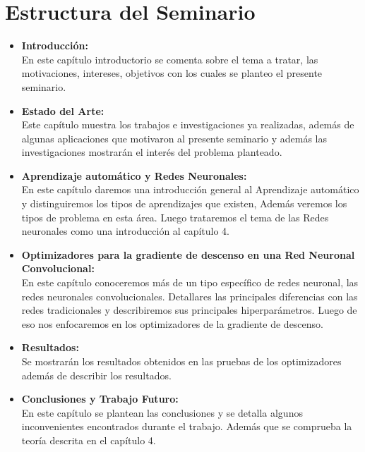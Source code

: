 \section{Estructura del Seminario}


\begin{itemize}

\item \textbf{Introducción:} \\
En este capítulo introductorio se comenta sobre el tema a tratar, las motivaciones, intereses, objetivos con los cuales se planteo el presente seminario.

\item \textbf{Estado del Arte:} \\
Este capítulo muestra los trabajos e investigaciones ya realizadas, además de algunas aplicaciones que motivaron al presente seminario y además las investigaciones mostrarán el interés del problema planteado.

\item \textbf{Aprendizaje automático y Redes Neuronales:} \\
En este capítulo daremos una introducción general al Aprendizaje automático y distinguiremos los tipos de aprendizajes que existen, Además veremos los tipos de problema en esta área. Luego trataremos el tema de las Redes neuronales como una introducción al capítulo 4.
\item \textbf{Optimizadores para la gradiente de descenso en una Red Neuronal Convolucional:} \\
En este capítulo conoceremos más de un tipo específico de redes neuronal, las redes neuronales convolucionales. Detallares las principales diferencias con las redes tradicionales y describiremos sus principales hiperparámetros. Luego de eso nos enfocaremos en los optimizadores de la gradiente de descenso.
\item \textbf{Resultados:} \\
Se mostrarán los resultados obtenidos en las pruebas de los optimizadores además de describir los resultados.
\item \textbf{Conclusiones y Trabajo Futuro:} \\
En este capítulo se plantean las conclusiones y se detalla algunos inconvenientes encontrados durante el trabajo. Además que se comprueba la teoría descrita en el capítulo 4.


\end{itemize}



